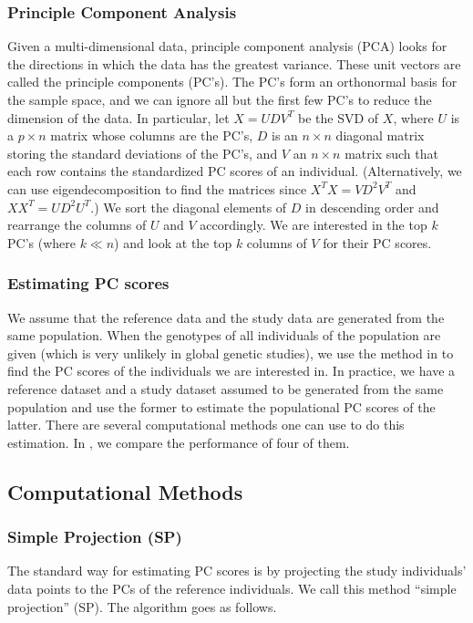 \documentclass{article}
\begin{document}
\subsubsection{Principle Component Analysis}\label{pca-intro}
  Given a multi-dimensional data, principle component analysis (PCA) looks for the directions in which the data has the greatest variance.
These unit vectors are called the principle components (PC's).
The PC's form an orthonormal basis for the sample space,
and we can ignore all but the first few PC's to reduce the dimension of the data.
In particular, let $X=UDV^T$ be the SVD of $X$,
where $U$ is a $p \times n$ matrix whose columns are the PC's,
$D$ is an $n \times n$ diagonal matrix storing the standard deviations of the PC's,
and $V$ an $n \times n$ matrix such that each row contains the standardized PC scores of an individual.
(Alternatively, we can use eigendecomposition to find the matrices since $X^T X = VD^2V^T$ and $X X^T = UD^2U^T$.)
We sort the diagonal elements of $D$ in descending order and rearrange the
columns of $U$ and $V$ accordingly.
We are interested in the top $k$ PC's (where $k \ll n$) and look at the top $k$
columns of $V$ for their PC scores.

\subsubsection{Estimating PC scores}

We assume that the reference data and the study data are generated from the same
population.
When the genotypes of all individuals of the population are given (which is very
unlikely in global genetic studies),
we use the method in  to find the PC scores of the individuals
we are interested in.
In practice, we have a reference dataset and a study dataset assumed to be generated from the
same population and use the former to estimate the populational PC scores of the latter.
There are several computational methods one can use to do this estimation.
In , we compare the performance of four of them.

\subsection{Computational Methods}\label{sec:compu}



\subsubsection{Simple Projection (SP)}
The standard way for estimating PC scores is by projecting the study
individuals' data points to the PCs of the reference individuals.
We call this method ``simple projection'' (SP).
The algorithm goes as follows.
\end{document}
